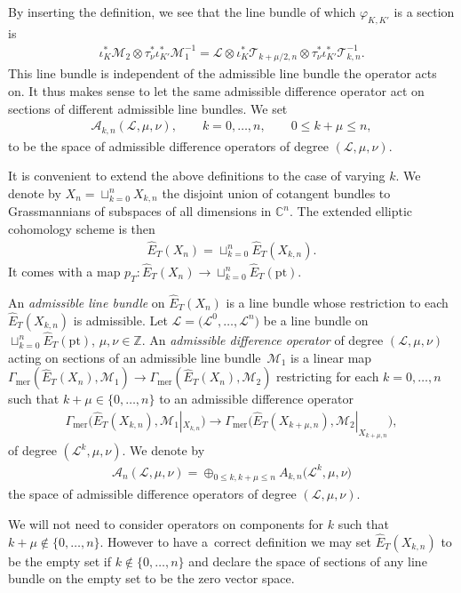 \documentclass[10pt,a4paper]{amsart}
\numberwithin{equation}{section}
\begin{document}
By inserting the definition, we see that the line bundle of which $\varphi_{K,K'}$ is a section is
\begin{gather*}
 \iota_K^*\mathcal M_2\otimes \tau_\nu^*\iota_{K'}^*\mathcal M_1^{-1}= \mathcal L\otimes \iota^*_{K}\mathcal T_{k+\mu/2,n}\otimes \tau_\nu^*\iota_{K'}^*\mathcal T_{k,n}^{-1}.
\end{gather*}
This line bundle is independent of the admissible line bundle the operator acts on. It thus makes sense to let the same admissible difference operator act on sections of different admissible line bundles. We set
\begin{gather*}
 \mathcal A_{k,n}(\mathcal L,\mu,\nu), \qquad k=0,\dots,n,\qquad 0\leq k+\mu\leq n,
\end{gather*}
to be the space of admissible difference operators of degree $(\mathcal L,\mu,\nu)$.

It is convenient to extend the above definitions to the case of varying $k$. We denote by $X_n=\sqcup_{k=0}^n X_{k,n}$ the disjoint union of cotangent bundles to Grassmannians of subspaces of all dimensions in $\mathbb C^n$. The extended elliptic cohomology scheme
is then
\begin{gather*}
 \hat E_T(X_n)=\sqcup_{k=0}^n \hat E_T(X_{k,n}).
\end{gather*}
It comes with a map $p_T\colon \hat E_T(X_n)\to \sqcup_{k=0}^n\hat E_T(\mathrm{pt})$.

\begin{Definition} An {\em admissible line bundle} on $\hat E_T(X_n)$ is a line bundle whose restriction to each $\hat E_T(X_{k,n})$ is admissible. Let $\mathcal L=\big(\mathcal L^0,\dots,\mathcal L^n\big)$ be a line bundle on $\sqcup_{k=0}^n\hat E_T(\mathrm{pt})$, $\mu,\nu\in\mathbb Z$. An {\em admissible difference operator} of degree $(\mathcal L,\mu,\nu)$ acting on sections of an admissible line bundle~$\mathcal M_1$ is a linear map $\Gamma_{\mathrm{mer}}(\hat E_T(X_n),\mathcal M_1)\to \Gamma_{\mathrm{mer}}(\hat E_T(X_n),\mathcal M_2)$ restricting for each $k=0,\dots,n$ such that $k+\mu\in\{0,\dots,n\}$ to an admissible difference operator
 \begin{gather*}
 \Gamma_{\mathrm{mer}}\big(\hat E_T(X_{k,n}),\mathcal M_1|_{X_{k,n}}\big)\to\Gamma_{\mathrm{mer}}\big(\hat E_T(X_{k+\mu,n}),\mathcal M_2|_{X_{k+\mu,n}}\big),
 \end{gather*}
 of degree $(\mathcal L^k,\mu,\nu)$. We denote by
 \begin{gather*}
 \mathcal A_n(\mathcal L,\mu,\nu)=\oplus_{0\leq k,k+\mu\leq n} A_{k,n}\big(\mathcal L^k,\mu,\nu\big)
 \end{gather*}
 the space of admissible difference operators of degree $(\mathcal L,\mu,\nu)$.
\end{Definition}
\begin{Remark} We will not need to consider operators on components for $k$ such that $k+\mu\not\in \{0,\dots,n\}$. However to have a~correct definition we may set $\hat E_T(X_{k,n})$ to be the empty set if $k\not\in\{0,\dots,n\}$ and declare the space of sections of any line bundle on the empty set to be the zero vector space.
\end{Remark}
\end{document}
